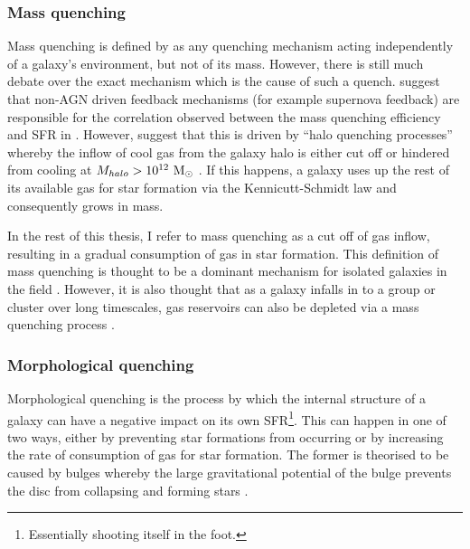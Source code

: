 \subsubsection{Mass quenching}\label{sec:massquench}

Mass quenching is defined by \citet{peng10, peng12} as any quenching mechanism acting independently of a galaxy's environment, but not of its mass. However, there is still much debate over the exact mechanism which is the cause of such a quench. \citet{darvish16} suggest that non-AGN driven feedback mechanisms (for example supernova feedback) are responsible for the correlation observed between the mass quenching efficiency and SFR in \citet{peng10}. However, \citet{gabor15} suggest that this is driven by ``halo quenching processes'' whereby the inflow of cool gas from the galaxy halo is either cut off or hindered from cooling at $M_{halo} > 10^{12}~\rm{M}_{\odot}$ \citep{birnboim03, dekel06}. If this happens, a galaxy uses up the rest of its available gas for star formation via the Kennicutt-Schmidt law \citep{schmidt59, kennicutt98} and consequently grows in mass.

In the rest of this thesis, I refer to mass quenching as a cut off of gas inflow, resulting in a gradual consumption of gas in star formation. This definition of mass quenching is thought to be a dominant mechanism for isolated galaxies in the field \citep{kormendy04}. However, it is also thought that as a galaxy infalls in to a group or cluster over long timescales, gas reservoirs can also be depleted via a mass quenching process \citep{peng12}. 

 
\subsubsection{Morphological quenching}\label{sec:moprhquench}

Morphological quenching is the process by which the internal structure of a galaxy can have a negative impact on its own SFR\footnote{Essentially shooting itself in the foot.}. This can happen in one of two ways, either by preventing star formations from occurring or by increasing the rate of consumption of gas for star formation. The former is theorised to be caused by bulges \citep{bluck14} whereby the large gravitational potential of the bulge prevents the disc from collapsing and forming stars \citep{Fang13}. 

